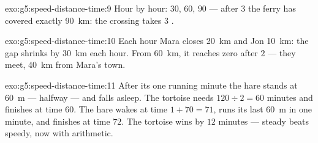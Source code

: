 \begin{solution}{exo:g5:speed-distance-time:9}
Hour by hour: $30$, $60$, $90$ --- after $3$  the ferry has
covered exactly \qty{90}{km}: the crossing takes $3$ .
\end{solution}

\begin{solution}{exo:g5:speed-distance-time:10}
Each hour Mara closes \qty{20}{km} and Jon \qty{10}{km}: the gap
shrinks by \qty{30}{km} each hour. From \qty{60}{km}, it reaches
zero after $2$  --- they meet, \qty{40}{km} from Mara's town.
\end{solution}

\begin{solution}{exo:g5:speed-distance-time:11}
After its one running minute the hare stands at \qty{60}{m} ---
halfway --- and falls asleep. The tortoise needs $120 \div 2 = 60$
minutes and finishes at time $60$. The hare wakes at time $1 + 70 =
71$, runs its last \qty{60}{m} in one minute, and finishes at time
$72$. The tortoise wins by $12$ minutes --- steady beats speedy,
now with arithmetic.
\end{solution}
